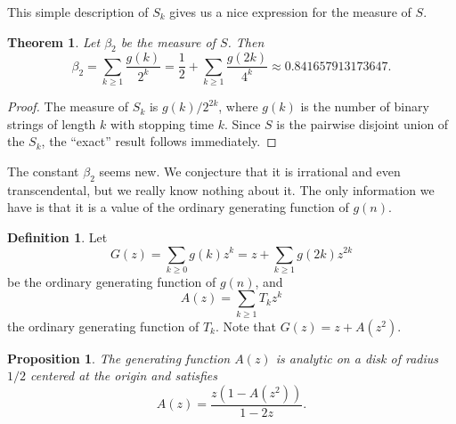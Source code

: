 \documentclass[12pt]{amsart}
\newtheorem{theorem}{Theorem}
\newtheorem{proposition}{Proposition}
\theoremstyle{definition}
\newtheorem{definition}{Definition}
\begin{document}
This simple description of $S_k$ gives us a nice expression for the measure of
$S$.

\begin{theorem}
    Let $\beta_2$ be the measure of $S$. Then
    \begin{equation*}
        \beta_2 = \sum_{k \geq 1} \frac{g(k)}{2^k} = \frac{1}{2} + \sum_{k \geq 1} \frac{g(2k)}{4^k}
        \approx 0.841657913173647.
    \end{equation*}
\end{theorem}

\begin{proof}
    The measure of $S_k$ is $g(k) / 2^{2k}$, where $g(k)$ is the number of
    binary strings of length $k$ with stopping time $k$. Since $S$ is the
    pairwise disjoint union of the $S_k$, the ``exact'' result follows
    immediately.
\end{proof}

The constant $\beta_2$ seems new. We conjecture that it is irrational and even
transcendental, but we really know nothing about it. The only information we
have is that it is a value of the ordinary generating function of $g(n)$.

\begin{definition}
    Let
    \begin{equation*}
        G(z) = \sum_{k \geq 0} g(k) z^k = z + \sum_{k \geq 1} g(2k) z^{2k}
    \end{equation*}
    be the ordinary generating function of $g(n)$, and
    \begin{equation*}
        A(z) = \sum_{k \geq 1} T_k z^k
    \end{equation*}
    the ordinary generating function of $T_k$. Note that $G(z) = z + A(z^2)$.
\end{definition}

\begin{proposition}
    The generating function $A(z)$ is analytic on a disk of radius $1 / 2$
    centered at the origin and satisfies
    \begin{equation*}
        A(z) = \frac{z(1 - A(z^2))}{1 - 2z}.
    \end{equation*}
\end{proposition}
\end{document}
